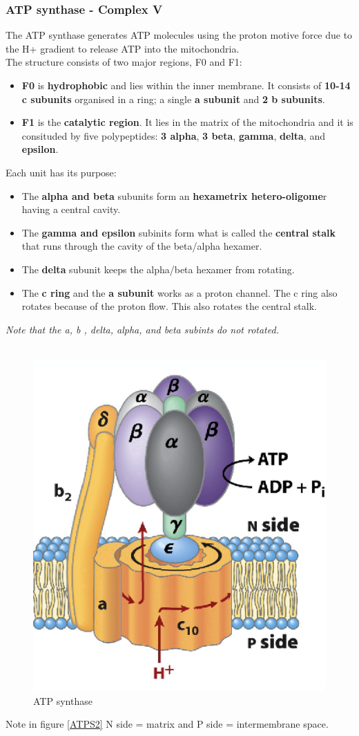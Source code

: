\documentclass[../main.tex]{subfiles}
\begin{document}
\subsubsection{ATP synthase - Complex V}
The ATP synthase generates ATP molecules using the proton motive force due to the H+ gradient to release ATP into the mitochondria. \\
The structure consists of two major regions, F0 and F1: 
\begin{itemize}
	\item \textbf{F0} is \textbf{hydrophobic} and lies within the inner membrane. It consists of \textbf{10-14 c subunits} organised in a ring; a single \textbf{a subunit} and \textbf{2 b subunits}.  
	\item \textbf{F1} is the \textbf{catalytic region}. It lies in the matrix of the mitochondria and it is consituded by five polypeptides: \textbf{3 alpha}, \textbf{3 beta}, \textbf{gamma}, \textbf{delta}, and \textbf{epsilon}. 
\end{itemize}
\noindent Each unit has its purpose: 
\begin{itemize}
	\item The \textbf{alpha and beta} subunits form an \textbf{hexametrix hetero-oligome}r having a central cavity.
	\item The \textbf{gamma and epsilon} subinits form what is called  the \textbf{central stalk} that runs through the cavity of the beta/alpha hexamer.
	\item The \textbf{delta} subunit keeps the alpha/beta hexamer from rotating.
	\item The \textbf{c ring} and the \textbf{a subunit} works as a proton channel. The c ring also rotates because of the proton flow. This also rotates the  central stalk. 
\end{itemize} 
\noindent \textit{Note that the a, b , delta, alpha, and beta subints do not rotated.} \\
\\
\begin{figure}[H]
	\centering
	\includegraphics[width = 0.5 \textwidth]{ATPS1}
	\caption{ATP synthase}
	\label{ATPS1}
\end{figure}
\noindent Note in figure \ref{ATPS2} N side = matrix and P side = intermembrane space. 
\end{document}
